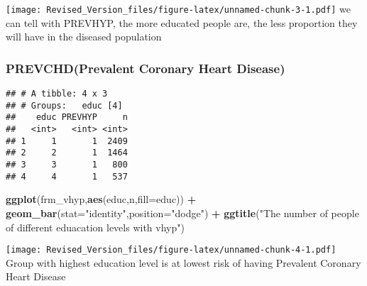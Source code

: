 \documentclass[]{article}
\newenvironment{Shaded}{\begin{snugshade}}{\end{snugshade}}
\newcommand{\KeywordTok}[1]{\textcolor[rgb]{0.13,0.29,0.53}{\textbf{#1}}}
\newcommand{\DataTypeTok}[1]{\textcolor[rgb]{0.13,0.29,0.53}{#1}}
\newcommand{\DecValTok}[1]{\textcolor[rgb]{0.00,0.00,0.81}{#1}}
\newcommand{\StringTok}[1]{\textcolor[rgb]{0.31,0.60,0.02}{#1}}
\newcommand{\OperatorTok}[1]{\textcolor[rgb]{0.81,0.36,0.00}{\textbf{#1}}}
\newcommand{\NormalTok}[1]{#1}
\begin{document}
\texttt{[image: Revised\_Version\_files/figure-latex/unnamed-chunk-3-1.pdf]}
we can tell with PREVHYP, the more educated people are, the less
proportion they will have in the diseased population

\subsubsection{PREVCHD(Prevalent Coronary Heart
Disease)}\label{prevchdprevalent-coronary-heart-disease}

\begin{Shaded}
\end{Shaded}

\begin{verbatim}
## # A tibble: 4 x 3
## # Groups:   educ [4]
##    educ PREVHYP     n
##   <int>   <int> <int>
## 1     1       1  2409
## 2     2       1  1464
## 3     3       1   800
## 4     4       1   537
\end{verbatim}

\begin{Shaded}
\begin{Highlighting}[]
\KeywordTok{ggplot}\NormalTok{(frm_vhyp,}\KeywordTok{aes}\NormalTok{(educ,n,}\DataTypeTok{fill=}\NormalTok{educ)) }\OperatorTok{+}
\StringTok{  }\KeywordTok{geom_bar}\NormalTok{(}\DataTypeTok{stat=}\StringTok{"identity"}\NormalTok{,}\DataTypeTok{position=}\StringTok{"dodge"}\NormalTok{) }\OperatorTok{+}
\StringTok{  }\KeywordTok{ggtitle}\NormalTok{(}\StringTok{"The number of people of different eduacation levels with vhyp"}\NormalTok{)}
\end{Highlighting}
\end{Shaded}

\texttt{[image: Revised\_Version\_files/figure-latex/unnamed-chunk-4-1.pdf]}
Group with highest education level is at lowest risk of having Prevalent
Coronary Heart Disease
\end{document}
